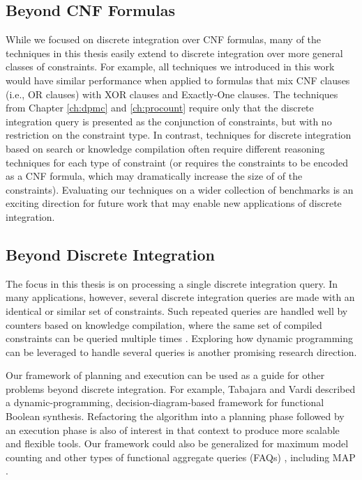 \subsection{Beyond CNF Formulas}
While we focused on discrete integration over CNF formulas, many of the techniques in this thesis easily extend to discrete integration over more general classes of constraints.
For example, all techniques we introduced in this work would have similar performance when applied to formulas that mix CNF clauses (i.e., OR clauses) with XOR clauses and Exactly-One clauses. %
The techniques from Chapter \ref{ch:dpmc} and \ref{ch:procount} require only that the discrete integration query is presented as the conjunction of constraints, but with no restriction on the constraint type. 
In contrast, techniques for discrete integration based on search or knowledge compilation often require different reasoning techniques for each type of constraint (or requires the constraints to be encoded as a CNF formula, which may dramatically increase the size of of the constraints).
Evaluating our techniques on a wider collection of benchmarks is an exciting direction for future work that may enable new applications of discrete integration.


\subsection{Beyond Discrete Integration}
The focus in this thesis is on processing a single discrete integration query. 
In many applications, however, several discrete integration queries are made with an identical or similar set of constraints.
Such repeated queries are handled well by counters based on knowledge compilation, where the same set of compiled constraints can be queried multiple times \cite{koriche2013knowledge,LM17,darwiche2004new,OD15}.
Exploring how dynamic programming can be leveraged to handle several queries is another promising research direction.

Our framework of planning and execution can be used as a guide for other problems beyond discrete integration.
For example, Tabajara and Vardi \cite{tabajara2017factored} described a dynamic-programming, decision-diagram-based framework for functional Boolean synthesis.
Refactoring the algorithm into a planning phase followed by an execution phase is also of interest in that context to produce more scalable and flexible tools.
Our framework could also be generalized for maximum model counting \cite{fremont2017maximum} and other types of functional aggregate queries (FAQs) \cite{KNR16}, including MAP \cite{murphy2012machine,maua2015complexity,xue2016solving}.
